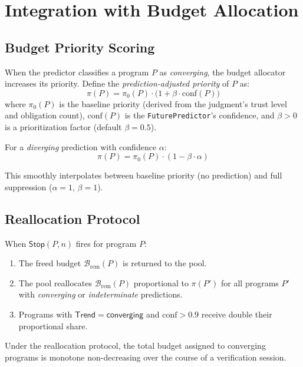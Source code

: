 \documentclass[11pt]{article}
\newcommand{\Trend}{\mathsf{Trend}}         %
\newcommand{\Budget}{\mathcal{B}}           %
\newcommand{\BudgetRem}[1]{\Budget_{\mathrm{rem}}(#1)}
\newcommand{\EarlyStop}{\mathsf{Stop}}      %
\begin{document}
\section{Integration with Budget Allocation}\label{sec:budget}

\subsection{Budget Priority Scoring}

When the predictor classifies a program $P$ as \emph{converging}, the
budget allocator increases its priority.  Define the
\emph{prediction-adjusted priority} of $P$ as:
\[
  \pi(P) = \pi_0(P) \cdot \bigl(1 + \beta \cdot \mathrm{conf}(P)\bigr)
\]
where $\pi_0(P)$ is the baseline priority (derived from the judgment's
trust level and obligation count), $\mathrm{conf}(P)$ is the
\texttt{FuturePredictor}'s confidence, and $\beta > 0$ is a
prioritization factor (default $\beta = 0.5$).

For a \emph{diverging} prediction with confidence $\alpha$:
\[
  \pi(P) = \pi_0(P) \cdot (1 - \beta \cdot \alpha)
\]

\noindent
This smoothly interpolates between baseline priority (no prediction) and
full suppression ($\alpha = 1$, $\beta = 1$).

\subsection{Reallocation Protocol}

When $\EarlyStop(P, n)$ fires for program $P$:
\begin{enumerate}
  \item The freed budget $\BudgetRem{P}$ is returned to the pool.
  \item The pool reallocates $\BudgetRem{P}$ proportional to
        $\pi(P')$ for all programs $P'$ with \emph{converging}
        or \emph{indeterminate} predictions.
  \item Programs with $\Trend = \mathsf{converging}$ and
        $\mathrm{conf} > 0.9$ receive double their proportional share.
\end{enumerate}

\begin{proposition}\label{prop:budget-monotone}
Under the reallocation protocol, the total budget assigned to
converging programs is monotone non-decreasing over the course of
a verification session.
\end{proposition}
\end{document}
